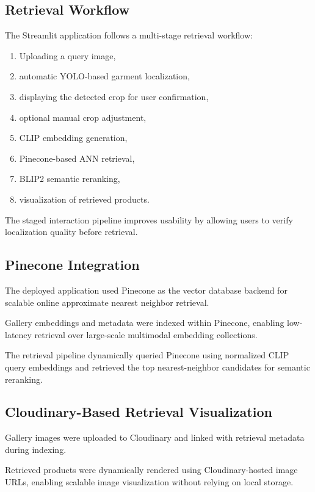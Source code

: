 \documentclass[11pt,a4paper]{article}
\begin{document}
\subsection{Retrieval Workflow}

The Streamlit application follows a multi-stage retrieval workflow:

\begin{enumerate}
    \item Uploading a query image,
    \item automatic YOLO-based garment localization,
    \item displaying the detected crop for user confirmation,
    \item optional manual crop adjustment,
    \item CLIP embedding generation,
    \item Pinecone-based ANN retrieval,
    \item BLIP2 semantic reranking,
    \item visualization of retrieved products.
\end{enumerate}

The staged interaction pipeline improves usability by allowing users to verify localization quality before retrieval.

\subsection{Pinecone Integration}

The deployed application used Pinecone as the vector database backend for scalable online approximate nearest neighbor retrieval.

Gallery embeddings and metadata were indexed within Pinecone, enabling low-latency retrieval over large-scale multimodal embedding collections.

The retrieval pipeline dynamically queried Pinecone using normalized CLIP query embeddings and retrieved the top nearest-neighbor candidates for semantic reranking.

\subsection{Cloudinary-Based Retrieval Visualization}

Gallery images were uploaded to Cloudinary and linked with retrieval metadata during indexing.

Retrieved products were dynamically rendered using Cloudinary-hosted image URLs, enabling scalable image visualization without relying on local storage.
\end{document}

